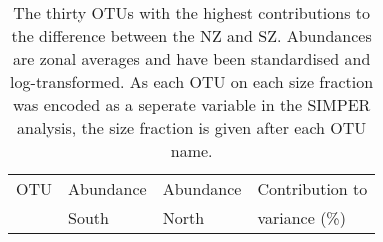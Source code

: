 \begin{table}
\begin{center}
\caption[Highest-contributing \acp{OTU} to the difference between the North and South zones]{ 
The thirty \acp{OTU} with the highest contributions to the difference between the \ac{NZ} and \ac{SZ}. 
  Abundances are zonal averages and have been standardised and log-transformed.
  As each \ac{OTU} on each size fraction was encoded as a seperate variable in the \ac{SIMPER} analysis, the size fraction is given after each \ac{OTU} name.
  }
\label{tab:otussimper}
\smallskip
\begin{tabularx}{\textwidth}{Xlll}
\toprule
OTU & Abundance & Abundance & Contribution to\\
& South & North & variance (\%)\\


\end{tabularx}
\end{center}
\end{table}

